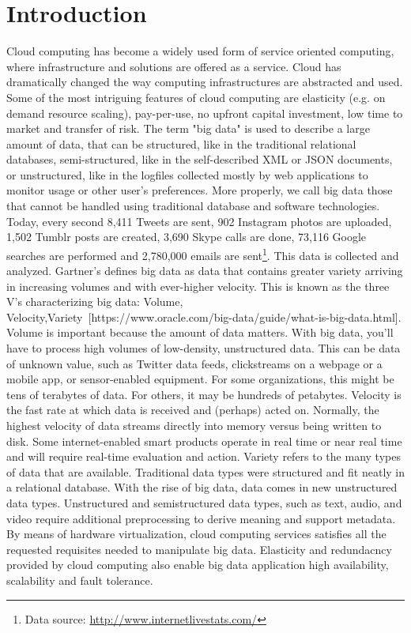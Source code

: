 

\chapter*{Introduction}
Cloud computing has become a widely used form of service oriented computing, where
infrastructure and solutions are offered as a service. Cloud has dramatically changed the way computing infrastructures are abstracted and used. Some of the most intriguing features of cloud computing are elasticity (e.g. on demand resource scaling), pay-per-use, no upfront capital investment, low time to market and transfer of risk. The term "big data" is used to describe a large amount of data, that can be structured, like in the traditional relational databases, semi-structured, like in the self-described XML or JSON documents, or unstructured, like in the logfiles collected mostly by web applications to monitor usage or other user's preferences. More properly, we call big data those that cannot be handled using traditional database and software technologies. Today, every second 8,411 Tweets are sent, 902 Instagram photos are uploaded, 1,502 Tumblr posts are created, 3,690 Skype calls are done, 73,116 Google searches are performed and 2,780,000 emails are sent\footnote{Data source:  \url{http://www.internetlivestats.com/}}. This data is collected and analyzed. Gartner’s defines big data as data that contains greater variety arriving in increasing volumes and with ever-higher velocity. This is known as the three V's characterizing  big data: Volume, Velocity,Variety~\cite{WhatIsBigData}[https://www.oracle.com/big-data/guide/what-is-big-data.html]. Volume is important because the amount of data matters. With big data, you’ll have to process high volumes of low-density, unstructured data. This can be data of unknown value, such as Twitter data feeds, clickstreams on a webpage or a mobile app, or sensor-enabled equipment. For some organizations, this might be tens of terabytes of data. For others, it may be hundreds of petabytes. Velocity is the fast rate at which data is received and (perhaps) acted on. Normally, the highest velocity of data streams directly into memory versus being written to disk. Some internet-enabled smart products operate in real time or near real time and will require real-time evaluation and action. Variety refers to the many types of data that are available. Traditional data types were structured and fit neatly in a relational database. With the rise of big data, data comes in new unstructured data types. Unstructured and semistructured data types, such as text, audio, and video require additional preprocessing to derive meaning and support metadata. By means of hardware virtualization, cloud computing services satisfies all the requested requisites needed to manipulate big data. Elasticity and redundacncy provided by cloud computing also enable big data application high availability, scalability and fault tolerance.
